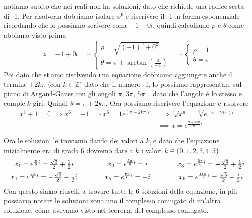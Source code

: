 \documentclass{rapport}
\begin{document}
notiamo subito che nei reali non ha soluzioni, dato che richiede una radice sesta di -1. Per risolverla dobbiamo isolare $x^6$ e riscrivere il -1 in forma esponenziale ricordando che lo possiamo scrivere come $-1+0i$, quindi calcoliamo $\rho$ e $\theta$ come abbiamo visto prima
\[
z= -1 + 0i \implies \begin{cases}
  \rho = \sqrt{(-1)^2 + 0^2} \\
  \theta = \pi + \arctan\left(\frac{0}{-1}\right)
\end{cases} \implies \begin{cases}
  \rho = 1 \\
  \theta = \pi 
\end{cases}
\]
Poi dato che stiamo risolvendo una equazione dobbiamo aggiungere anche il termine $+2k\pi$ (con $k\in\mathbb{Z})$ dato che il numero -1, lo possiamo rappresentare sul piano di Argand-Gauss con gli angoli $\pi$, $3\pi$, $5\pi$... dato che l'angolo è lo stesso e compie $k$ giri. Quindi $\theta = \pi + 2k\pi$. Ora possiamo riscrivere l'equazione e risolvere
\begin{align*}
  x^6+1=0 \implies x^6=-1 \implies x^6 = 1e^{(\pi  + 2k\pi)i} &\implies \sqrt[6]{x^6} = \sqrt[6]{e^{(\pi  + 2k\pi)i}}\\
  &\implies x = e^{\frac{\pi  + 2k\pi}{6}i}
\end{align*}

Ora le soluzioni le troviamo dando dei valori a $k$, e dato che l'equazione inizialmente era di grado 6 dovremo dare a $k$ i valori $k\in\{0,1,2,3,4,5\}$
\[
\begin{array}{c@{\qquad}@{\qquad}c@{\qquad}@{\qquad}c}
  x_1 = e^{\frac{\pi}{6}i} =  \frac{\sqrt{3}}{2}+ \frac{1}{2}i &  x_2= e^{\frac{3\pi}{6}i} = i &  x_3= e^{\frac{5\pi}{6}i} = -\frac{\sqrt{3}}{2}+ \frac{1}{2}i \\[0.5em]
  x_4 = e^{\frac{7\pi}{6}i} =  -\frac{\sqrt{3}}{2}- \frac{1}{2}i&  x_5= e^{\frac{9\pi}{6}i} = -i &  x_6= e^{\frac{11\pi}{6}i}  = \frac{\sqrt{3}}{2}-\frac{1}{2}i
\end{array}
\] 
Con questo siamo riusciti a trovare tutte le 6 soluzioni della equazione, in più possiamo notare le soluzioni sono uno il complesso coniugato di un'altra soluzione, come avevamo visto nel teorema del complesso coniugato.
\end{document}
